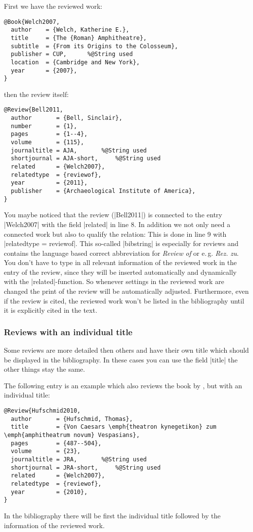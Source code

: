 \documentclass[a4paper,
10pt,
greek,
french,
spanish,
italian,
ngerman,
english
]{ltxdoc}
\begin{document}
First we have the reviewed work:
\begin{lstlisting}[style=bibentry,label=Welch2007,caption={{@}Book\{Welch2007,…\} }]
@Book{Welch2007,
  author    = {Welch, Katherine E.},
  title     = {The {Roman} Amphitheatre},
  subtitle  = {From its Origins to the Colosseum},
  publisher = CUP,		%@String used
  location  = {Cambridge and New York},
  year      = {2007},
}
\end{lstlisting}
then the review itself:
\begin{lstlisting}[style=bibentry,label=Bell2011,caption={{@}Review\{Bell2011,…\} }]
@Review{Bell2011,
  author       = {Bell, Sinclair},
  number       = {1},
  pages        = {1--4},
  volume       = {115},
  journaltitle = AJA,		%@String used
  shortjournal = AJA-short,		%@String used
  related      = {Welch2007},
  relatedtype  = {reviewof},
  year         = {2011},
  publisher    = {Archaeological Institute of America},
}
\end{lstlisting}
You maybe noticed that the review (|Bell2011|) is connected to the entry |Welch2007| with the field |related| in line 8.
In addition we not only need a connected work but also to qualify the relation:
This is done in line 9 with |relatedtype = {reviewof}|.
This so-called |bibstring| is especially for reviews and contains the language based correct abbreviation for \emph{Review of} or e.\,g. \emph{Rez. zu}.
You don’t have to type in all relevant information of the reviewed work in the entry of the review, 
since they will be inserted automatically and dynamically with the  |related|-function. 
So whenever settings in the reviewed work are changed the print of the review will be automatically adjusted. 
Furthermore, even if the review is cited, the reviewed work won't be listed in the bibliography until it is explicitly cited in the text.


\subsubsection{Reviews with an individual title}
Some reviews are more detailed then others and  have their own title which should be displayed in the bibliography.
In these cases you can use the field |title| the other things stay the same.

The following entry is an example which also reviews the book by \citeauthor*{Welch2007},  but with an individual title:
\begin{lstlisting}[style=bibentry,label=Hufschmid2010,caption={{@}Review\{Hufschmid2010,…\} }]
@Review{Hufschmid2010,
  author       = {Hufschmid, Thomas},
  title        = {Von Caesars \emph{theatron kynegetikon} zum \emph{amphitheatrum novum} Vespasians},
  pages        = {487--504},
  volume       = {23},
  journaltitle = JRA,		%@String used
  shortjournal = JRA-short,		%@String used
  related      = {Welch2007},
  relatedtype  = {reviewof},
  year         = {2010},
}
\end{lstlisting}
In the bibliography there will be first the individual title followed by the information of the reviewed work.
\end{document}
